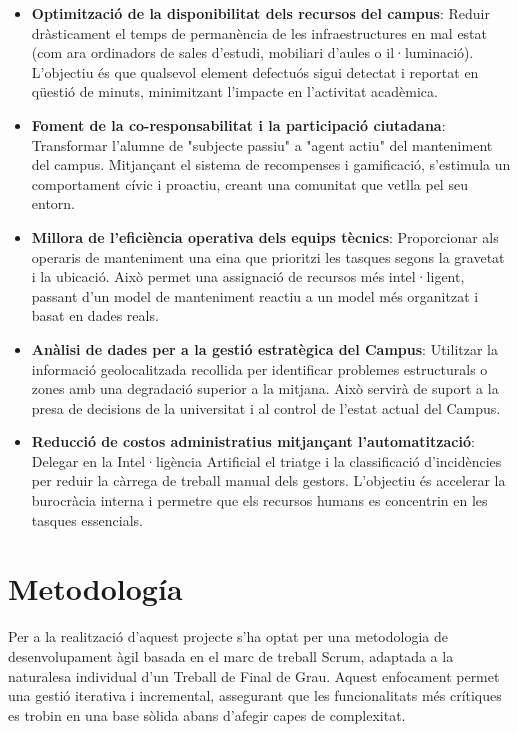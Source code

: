\begin{itemize}
	\item \textbf{Optimització de la disponibilitat dels recursos del campus}: Reduir dràsticament el temps de permanència de les infraestructures en mal estat (com ara ordinadors de sales d'estudi, mobiliari d'aules o il·luminació). L'objectiu és que qualsevol element defectuós sigui detectat i reportat en qüestió de minuts, minimitzant l'impacte en l'activitat acadèmica.
	
	\item \textbf{Foment de la co-responsabilitat i la participació ciutadana}: Transformar l'alumne de "subjecte passiu" a "agent actiu" del manteniment del campus. Mitjançant el sistema de recompenses i gamificació, s'estimula un comportament cívic i proactiu, creant una comunitat que vetlla pel seu entorn.
	
	\item \textbf{Millora de l'eficiència operativa dels equips tècnics}: Proporcionar als operaris de manteniment una eina que prioritzi les tasques segons la gravetat i la ubicació. Això permet una assignació de recursos més intel·ligent, passant d'un model de manteniment reactiu a un model més organitzat i basat en dades reals.
	
	\item \textbf{Anàlisi de dades per a la gestió estratègica del Campus}: Utilitzar la informació geolocalitzada recollida per identificar problemes estructurals o zones amb una degradació superior a la mitjana. Això servirà de suport a la presa de decisions de la universitat i al control de l'estat actual del Campus.
	
	\item \textbf{Reducció de costos administratius mitjançant l'automatització}: Delegar en la Intel·ligència Artificial el triatge i la classificació d'incidències per reduir la càrrega de treball manual dels gestors. L'objectiu és accelerar la burocràcia interna i permetre que els recursos humans es concentrin en les tasques essencials.
	
\end{itemize}

\section{Metodología}
Per a la realització d'aquest projecte s'ha optat per una metodologia de desenvolupament àgil basada en el marc de treball Scrum\cite{4}, adaptada a la naturalesa individual d'un Treball de Final de Grau. Aquest enfocament permet una gestió iterativa i incremental, assegurant que les funcionalitats més crítiques es trobin en una base sòlida abans d'afegir capes de complexitat.

